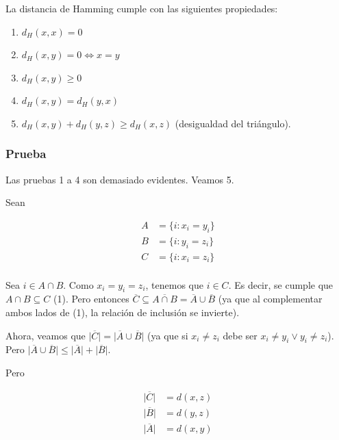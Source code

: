 \documentclass[10pt,a4paper]{article}
\begin{document}
La distancia de Hamming cumple con las siguientes propiedades:

\begin{enumerate}

	\item $d_H(x, x) = 0$
	\item $d_H(x, y) = 0 \Leftrightarrow x = y$
	\item $d_H(x, y) \geq 0$
	\item $d_H(x,y) = d_H(y, x)$
	\item $d_H(x, y) + d_H(y, z) \geq d_H(x, z)$ (desigualdad del triángulo).
\end{enumerate}

\subsubsection*{Prueba}

Las pruebas 1 a 4 son demasiado evidentes. Veamos 5.

Sean

\begin{center}
\begin{align*}
A &= \{i: x_i = y_i\}\\
B &= \{i: y_i = z_i\}\\
C &= \{i: x_i = z_i\}\\
\end{align*}

\end{center}

Sea $i \in A \cap B$. Como $x_i = y_i = z_i$, tenemos que $i \in C$. Es decir, se cumple que $A \cap B \subseteq C$ (1). Pero entonces $\overline{C} \subseteq \overline{A\cap B} = \overline{A} \cup \overline{B}$ (ya que al complementar ambos lados de (1), la relación de inclusión se invierte).

Ahora, veamos que $\lvert \overline{C}\rvert=\lvert \overline{A} \cup \overline{B}\rvert$ (ya que si $x_i \neq z_i$ debe ser $x_i \neq y_i \lor y_i \neq z_i$). Pero $\lvert \overline{A} \cup \overline{B}\rvert \leq \lvert \overline{A}\rvert + \lvert\overline{B}\rvert$.

Pero

\begin{center}
\begin{align*}
\lvert \overline{C}\rvert &= d(x,z)\\
\lvert \overline{B}\rvert &= d(y,z)\\
\lvert \overline{A}\rvert &= d(x,y)\\
\end{align*}
\end{center}
\end{document}
